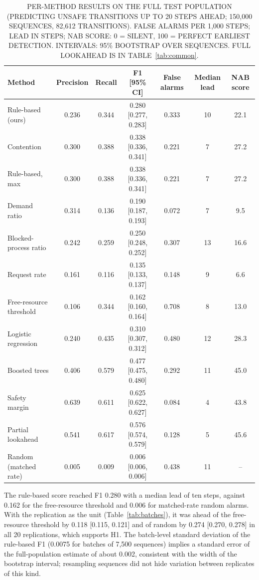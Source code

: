\documentclass[conference]{IEEEtran}
\begin{document}
\begin{table}[t]
\centering\footnotesize
\caption{PER-METHOD RESULTS ON THE FULL TEST POPULATION (PREDICTING UNSAFE TRANSITIONS UP TO 20 STEPS AHEAD; 150,000 SEQUENCES, 82,612 TRANSITIONS). FALSE ALARMS PER 1,000 STEPS; LEAD IN STEPS; NAB SCORE: 0 = SILENT, 100 = PERFECT EARLIEST DETECTION. INTERVALS: 95\% BOOTSTRAP OVER SEQUENCES. FULL LOOKAHEAD IS IN TABLE~\ref{tab:common}.}
\label{tab:main}
\begin{tabular}{lcccccc}
\toprule
Method & Precision & Recall & F1 [95\% CI] & False alarms & Median lead & NAB score \\
\midrule
Rule-based (ours) & 0.236 & 0.344 & 0.280 [0.277, 0.283] & 0.333 & 10 & 22.1 \\
Contention & 0.300 & 0.388 & 0.338 [0.336, 0.341] & 0.221 & 7 & 27.2 \\
Rule-based, max & 0.300 & 0.388 & 0.338 [0.336, 0.341] & 0.221 & 7 & 27.2 \\
Demand ratio & 0.314 & 0.136 & 0.190 [0.187, 0.193] & 0.072 & 7 & 9.5 \\
Blocked-process ratio & 0.242 & 0.259 & 0.250 [0.248, 0.252] & 0.307 & 13 & 16.6 \\
Request rate & 0.161 & 0.116 & 0.135 [0.133, 0.137] & 0.148 & 9 & 6.6 \\
Free-resource threshold & 0.106 & 0.344 & 0.162 [0.160, 0.164] & 0.708 & 8 & 13.0 \\
Logistic regression & 0.240 & 0.435 & 0.310 [0.307, 0.312] & 0.480 & 12 & 28.3 \\
Boosted trees & 0.406 & 0.579 & 0.477 [0.475, 0.480] & 0.292 & 11 & 45.0 \\
Safety margin & 0.639 & 0.611 & 0.625 [0.622, 0.627] & 0.084 & 4 & 43.8 \\
Partial lookahead & 0.541 & 0.617 & 0.576 [0.574, 0.579] & 0.128 & 5 & 45.6 \\
Random (matched rate) & 0.005 & 0.009 & 0.006 [0.006, 0.006] & 0.438 & 11 & -- \\
\bottomrule
\end{tabular}
\end{table}

The rule-based score reached F1 0.280 with a median lead of ten steps, against 0.162 for the free-resource threshold and 0.006 for matched-rate random alarms. With the replication as the unit (Table~\ref{tab:batches}), it was ahead of the free-resource threshold by 0.118 [0.115, 0.121] and of random by 0.274 [0.270, 0.278] in all 20 replications, which supports H1. The batch-level standard deviation of the rule-based F1 (0.0075 for batches of 7,500 sequences) implies a standard error of the full-population estimate of about 0.002, consistent with the width of the bootstrap interval; resampling sequences did not hide variation between replicates of this kind.
\end{document}

